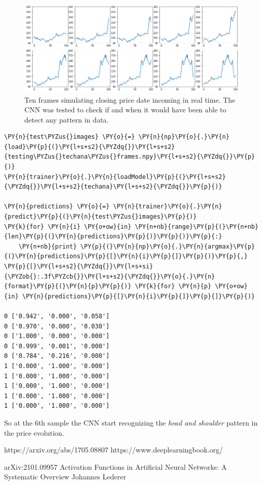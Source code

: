 \begin{figure}
	\centering
	\includegraphics[width=\textwidth]{figures/tech_ana_frames.png}
	\caption{Ten frames simulating closing price date incoming in real time. The CNN was tested to check if and when it would have been able to detect any pattern in data.}
	\label{fig:frame_simulation}
\end{figure}


\begin{codebox}[breakable, size=fbox, boxrule=1pt, pad at break*=1mm,colback=cellbackground, colframe=cellborder]
\begin{Verbatim}[commandchars=\\\{\}]
\PY{n}{test\PYZus{}images} \PY{o}{=} \PY{n}{np}\PY{o}{.}\PY{n}{load}\PY{p}{(}\PY{l+s+s2}{\PYZdq{}}\PY{l+s+s2}{testing\PYZus{}techana\PYZus{}frames.npy}\PY{l+s+s2}{\PYZdq{}}\PY{p}{)}
\PY{n}{trainer}\PY{o}{.}\PY{n}{loadModel}\PY{p}{(}\PY{l+s+s2}{\PYZdq{}}\PY{l+s+s2}{techana}\PY{l+s+s2}{\PYZdq{}}\PY{p}{)}
	
\PY{n}{predictions} \PY{o}{=} \PY{n}{trainer}\PY{o}{.}\PY{n}{predict}\PY{p}{(}\PY{n}{test\PYZus{}images}\PY{p}{)}
\PY{k}{for} \PY{n}{i} \PY{o+ow}{in} \PY{n+nb}{range}\PY{p}{(}\PY{n+nb}{len}\PY{p}{(}\PY{n}{predictions}\PY{p}{)}\PY{p}{)}\PY{p}{:}
    \PY{n+nb}{print} \PY{p}{(}\PY{n}{np}\PY{o}{.}\PY{n}{argmax}\PY{p}{(}\PY{n}{predictions}\PY{p}{[}\PY{n}{i}\PY{p}{]}\PY{p}{)}\PY{p}{,} \PY{p}{[}\PY{l+s+s2}{\PYZdq{}}\PY{l+s+si}{\PYZob{}:.3f\PYZcb{}}\PY{l+s+s2}{\PYZdq{}}\PY{o}{.}\PY{n}{format}\PY{p}{(}\PY{n}{p}\PY{p}{)} \PY{k}{for} \PY{n}{p} \PY{o+ow}{in} \PY{n}{predictions}\PY{p}{[}\PY{n}{i}\PY{p}{]}\PY{p}{]}\PY{p}{)}

0 ['0.942', '0.000', '0.058']
0 ['0.970', '0.000', '0.030']
0 ['1.000', '0.000', '0.000']
0 ['0.999', '0.001', '0.000']
0 ['0.784', '0.216', '0.000']
1 ['0.000', '1.000', '0.000']
1 ['0.000', '1.000', '0.000']
1 ['0.000', '1.000', '0.000']
1 ['0.000', '1.000', '0.000']
1 ['0.000', '1.000', '0.000']
\end{Verbatim}
\end{codebox}

So at the 6th sample the CNN start recognizing the \emph{head and
shoulder} pattern in the price evolution.


https://arxiv.org/abs/1705.08807
https://www.deeplearningbook.org/

	arXiv:2101.09957 Activation Functions in Artificial Neural Networks: A Systematic Overview
	Johannes Lederer
	
	